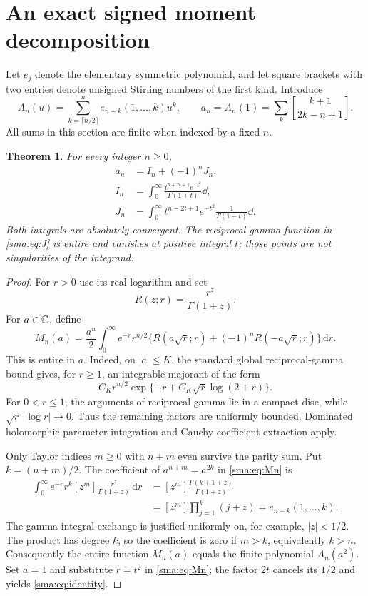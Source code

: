 \documentclass[11pt,letterpaper]{article}
\numberwithin{equation}{section}
\newtheorem{theorem}{Theorem}[section]\newtheorem{lemma}[theorem]{Lemma}\newtheorem{proposition}[theorem]{Proposition}\newtheorem{corollary}[theorem]{Corollary}\theoremstyle{remark}\newtheorem{remark}[theorem]{Remark}
\begin{document}
\section{An exact signed moment decomposition}
Let $e_j$ denote the elementary symmetric polynomial, and let square brackets with two entries denote unsigned Stirling numbers of the first kind. Introduce
\begin{equation}\label{sma:eq:An}
 A_n(u)=\sum_{k=\lceil n/2\rceil}^{n}e_{n-k}(1,\ldots,k)u^k,
 \qquad a_n=A_n(1)=\sum_k\genfrac{[}{]}{0pt}{}{k+1}{2k-n+1}.
\end{equation}
All sums in this section are finite when indexed by a fixed $n$.

\begin{theorem}\label{sma:thm:identity}
For every integer $n\ge0$,
\begin{align}
 a_n&=I_n+(-1)^nJ_n,\label{sma:eq:identity}\\
 I_n&=\int_0^\infty\frac{t^{n+2t+1}e^{-t^2}}{\Gamma(1+t)}\dd,\label{sma:eq:I}\\
 J_n&=\int_0^\infty t^{n-2t+1}e^{-t^2}\frac1{\Gamma(1-t)}\dd.\label{sma:eq:J}
\end{align}
Both integrals are absolutely convergent. The reciprocal gamma function in \eqref{sma:eq:J} is entire and vanishes at positive integral $t$; those points are not singularities of the integrand.
\end{theorem}
\begin{proof}
For $r>0$ use its real logarithm and set
\[
 R(z;r)=\frac{r^z}{\Gamma(1+z)}.
\]
For $a\in\mathbb C$, define
\begin{equation}\label{sma:eq:Mn}
 M_n(a)=\frac{a^n}{2}\int_0^\infty e^{-r}r^{n/2}
 \{R(a\sqrt r;r)+(-1)^nR(-a\sqrt r;r)\}\,\mathrm dr.
\end{equation}
This is entire in $a$. Indeed, on $|a|\le K$, the standard global reciprocal-gamma bound gives, for $r\ge1$, an integrable majorant of the form
\[
 C_Kr^{n/2}\exp\{-r+C_K\sqrt r\log(2+r)\}.
\]
For $0<r\le1$, the arguments of reciprocal gamma lie in a compact disc, while $\sqrt r\,|\log r|\to0$. Thus the remaining factors are uniformly bounded. Dominated holomorphic parameter integration and Cauchy coefficient extraction apply.

Only Taylor indices $m\ge0$ with $n+m$ even survive the parity sum. Put $k=(n+m)/2$. The coefficient of $a^{n+m}=a^{2k}$ in \eqref{sma:eq:Mn} is
\begin{align*}
 \int_0^\infty e^{-r}r^k[z^m]\frac{r^z}{\Gamma(1+z)}\,\mathrm dr
 &=[z^m]\frac{\Gamma(k+1+z)}{\Gamma(1+z)}\\
 &=[z^m]\prod_{j=1}^{k}(j+z)
 =e_{n-k}(1,\ldots,k).
\end{align*}
The gamma-integral exchange is justified uniformly on, for example, $|z|<1/2$. The product has degree $k$, so the coefficient is zero if $m>k$, equivalently $k>n$. Consequently the entire function $M_n(a)$ equals the finite polynomial $A_n(a^2)$. Set $a=1$ and substitute $r=t^2$ in \eqref{sma:eq:Mn}; the factor $2t$ cancels its $1/2$ and yields \eqref{sma:eq:identity}.
\end{proof}
\end{document}

